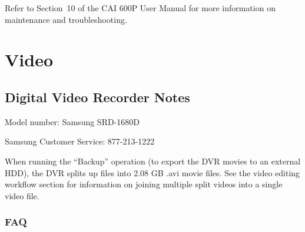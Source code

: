 \documentclass[11pt,oneside]{book}
\begin{document}
Refer to Section~10 of the CAI 600P User Manual for more information on maintenance and troubleshooting.


\chapter{Video}
\label{chap:Video}

\section{Digital Video Recorder Notes}

Model number: Samsung SRD-1680D

Samsung Customer Service: 877-213-1222

When running the ``Backup'' operation (to export the DVR movies to an external HDD), the DVR splits up files into 2.08 GB .avi movie files. See the video editing workflow section for information on joining multiple split videos into a single video file.

\subsection*{FAQ}
\end{document}
